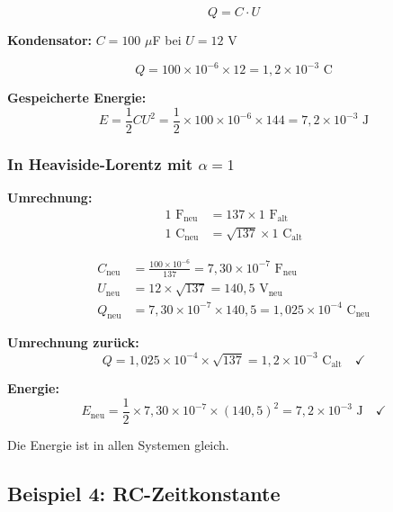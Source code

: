 	\begin{equation}
		Q = C \cdot U
	\end{equation}
	
	\textbf{Kondensator:} $C = 100$ $\mu$F bei $U = 12$ V
	
	\begin{equation}
		Q = 100 \times 10^{-6} \times 12 = 1{,}2 \times 10^{-3} \text{ C}
	\end{equation}
	
	\textbf{Gespeicherte Energie:}
	\begin{equation}
		E = \frac{1}{2} C U^2 = \frac{1}{2} \times 100 \times 10^{-6} \times 144 = 7{,}2 \times 10^{-3} \text{ J}
	\end{equation}
	
	\subsubsection{In Heaviside-Lorentz mit $\alpha = 1$}
	
	\textbf{Umrechnung:}
	\begin{align}
		1 \text{ F}_{\text{neu}} &= 137 \times 1 \text{ F}_{\text{alt}} \\
		1 \text{ C}_{\text{neu}} &= \sqrt{137} \times 1 \text{ C}_{\text{alt}}
	\end{align}
	
	\begin{align}
		C_{\text{neu}} &= \frac{100 \times 10^{-6}}{137} = 7{,}30 \times 10^{-7} \text{ F}_{\text{neu}} \\
		U_{\text{neu}} &= 12 \times \sqrt{137} = 140{,}5 \text{ V}_{\text{neu}} \\
		Q_{\text{neu}} &= 7{,}30 \times 10^{-7} \times 140{,}5 = 1{,}025 \times 10^{-4} \text{ C}_{\text{neu}}
	\end{align}
	
	\textbf{Umrechnung zurück:}
	\begin{equation}
		Q = 1{,}025 \times 10^{-4} \times \sqrt{137} = 1{,}2 \times 10^{-3} \text{ C}_{\text{alt}} \quad \checkmark
	\end{equation}
	
	\textbf{Energie:}
	\begin{equation}
		E_{\text{neu}} = \frac{1}{2} \times 7{,}30 \times 10^{-7} \times (140{,}5)^2 = 7{,}2 \times 10^{-3} \text{ J} \quad \checkmark
	\end{equation}
	
	Die Energie ist in allen Systemen gleich.
	
	\subsection{Beispiel 4: RC-Zeitkonstante}
	
